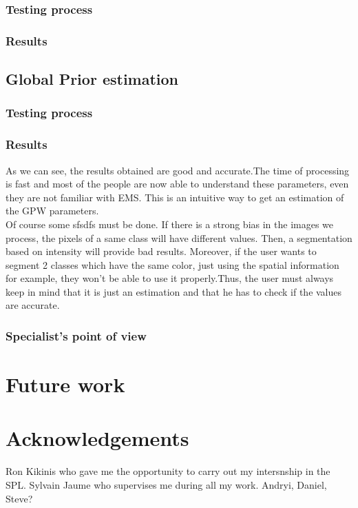 \subsubsection{Testing process}
%
\subsubsection{Results}

\subsection{Global Prior estimation}
%
\subsubsection{Testing process}
%
\subsubsection{Results}
As we can see, the results obtained are good and accurate.The time of processing is fast and most of the people are now able to understand these parameters, even they are not familiar with EMS. This is an intuitive way to get an estimation of the GPW parameters.\\
Of course some sfsdfs must be done.
If there is a strong bias in the images we process, the pixels of a same class will have different values. Then, a segmentation based on intensity will provide bad results. Moreover, if the user wants to segment 2 classes which have the same color, just using the spatial information for example, they won't be able to use it properly.Thus, the user must always keep in mind that it is just an estimation and that he has to check if the values are accurate.

%
\subsubsection{Specialist's point of view}


\section{Future work}
\newpage
\section*{Acknowledgements}
Ron Kikinis who gave me the opportunity to carry out my intersnship in the SPL.
Sylvain Jaume who supervises me during all my work.
Andryi, Daniel, Steve?

